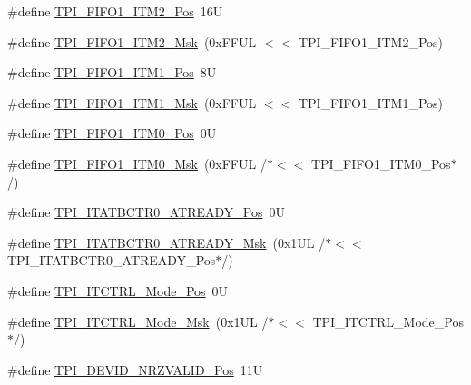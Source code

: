 \begin{DoxyCompactItemize}
\item 
\#define \hyperlink{group___c_m_s_i_s___t_p_i_ga1828c228f3940005f48fb8dd88ada35b}{T\-P\-I\-\_\-\-F\-I\-F\-O1\-\_\-\-I\-T\-M2\-\_\-\-Pos}~16\-U
\item 
\#define \hyperlink{group___c_m_s_i_s___t_p_i_gae54512f926ebc00f2e056232aa21d335}{T\-P\-I\-\_\-\-F\-I\-F\-O1\-\_\-\-I\-T\-M2\-\_\-\-Msk}~(0x\-F\-F\-U\-L $<$$<$ T\-P\-I\-\_\-\-F\-I\-F\-O1\-\_\-\-I\-T\-M2\-\_\-\-Pos)
\item 
\#define \hyperlink{group___c_m_s_i_s___t_p_i_gaece86ab513bc3d0e0a9dbd82258af49f}{T\-P\-I\-\_\-\-F\-I\-F\-O1\-\_\-\-I\-T\-M1\-\_\-\-Pos}~8\-U
\item 
\#define \hyperlink{group___c_m_s_i_s___t_p_i_ga3347f42828920dfe56e3130ad319a9e6}{T\-P\-I\-\_\-\-F\-I\-F\-O1\-\_\-\-I\-T\-M1\-\_\-\-Msk}~(0x\-F\-F\-U\-L $<$$<$ T\-P\-I\-\_\-\-F\-I\-F\-O1\-\_\-\-I\-T\-M1\-\_\-\-Pos)
\item 
\#define \hyperlink{group___c_m_s_i_s___t_p_i_ga2188671488417a52abb075bcd4d73440}{T\-P\-I\-\_\-\-F\-I\-F\-O1\-\_\-\-I\-T\-M0\-\_\-\-Pos}~0\-U
\item 
\#define \hyperlink{group___c_m_s_i_s___t_p_i_ga8ae09f544fc1a428797e2a150f14a4c9}{T\-P\-I\-\_\-\-F\-I\-F\-O1\-\_\-\-I\-T\-M0\-\_\-\-Msk}~(0x\-F\-F\-U\-L /$\ast$$<$$<$ T\-P\-I\-\_\-\-F\-I\-F\-O1\-\_\-\-I\-T\-M0\-\_\-\-Pos$\ast$/)
\item 
\#define \hyperlink{group___c_m_s_i_s___t_p_i_gab1eb6866c65f02fa9c83696b49b0f346}{T\-P\-I\-\_\-\-I\-T\-A\-T\-B\-C\-T\-R0\-\_\-\-A\-T\-R\-E\-A\-D\-Y\-\_\-\-Pos}~0\-U
\item 
\#define \hyperlink{group___c_m_s_i_s___t_p_i_gaee320b3c60f9575aa96a8742c4ff9356}{T\-P\-I\-\_\-\-I\-T\-A\-T\-B\-C\-T\-R0\-\_\-\-A\-T\-R\-E\-A\-D\-Y\-\_\-\-Msk}~(0x1\-U\-L /$\ast$$<$$<$ T\-P\-I\-\_\-\-I\-T\-A\-T\-B\-C\-T\-R0\-\_\-\-A\-T\-R\-E\-A\-D\-Y\-\_\-\-Pos$\ast$/)
\item 
\#define \hyperlink{group___c_m_s_i_s___t_p_i_gaa847adb71a1bc811d2e3190528f495f0}{T\-P\-I\-\_\-\-I\-T\-C\-T\-R\-L\-\_\-\-Mode\-\_\-\-Pos}~0\-U
\item 
\#define \hyperlink{group___c_m_s_i_s___t_p_i_gad6f87550b468ad0920d5f405bfd3f017}{T\-P\-I\-\_\-\-I\-T\-C\-T\-R\-L\-\_\-\-Mode\-\_\-\-Msk}~(0x1\-U\-L /$\ast$$<$$<$ T\-P\-I\-\_\-\-I\-T\-C\-T\-R\-L\-\_\-\-Mode\-\_\-\-Pos$\ast$/)
\item 
\#define \hyperlink{group___c_m_s_i_s___t_p_i_ga9f46cf1a1708575f56d6b827766277f4}{T\-P\-I\-\_\-\-D\-E\-V\-I\-D\-\_\-\-N\-R\-Z\-V\-A\-L\-I\-D\-\_\-\-Pos}~11\-U
\item 

\end{DoxyCompactItemize}
